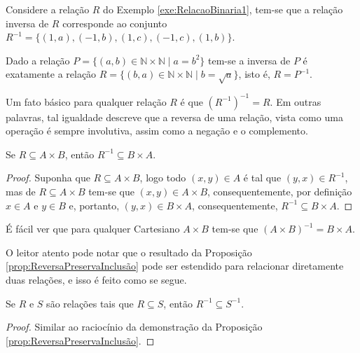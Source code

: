 \begin{example}
	Considere a relação $R$ do Exemplo \ref{exe:RelacaoBinaria1}, tem-se que a relação inversa de $R$ corresponde ao conjunto $R^{-1} = \{(1, a), (-1, b), (1, c), (-1, c), (1, b)\}$.
\end{example}

\begin{example}
	Dado a relação $P = \{(a, b) \in \mathbb{N} \times \mathbb{N} \mid a = b^2\}$ tem-se a inversa de $P$ é exatamente a relação $R = \{(b, a) \in \mathbb{N} \times \mathbb{N} \mid b = \sqrt{a}\}$, isto é, $R = P^{-1}$.
\end{example}

\begin{remark}\label{rema:InvolucaoRelacaoInversa}
	Um fato básico para qualquer relação $R$ é que $(R^{-1})^{-1} = R$. Em outras palavras, tal igualdade descreve que a reversa de uma relação, vista como uma operação é sempre involutiva, assim como a negação e o complemento.
\end{remark}

\begin{proposition}\label{prop:ReversaPreservaInclusão}
	Se $R \subseteq A \times B$, então $R^{-1} \subseteq B \times A$.
\end{proposition}

\begin{proof}
	Suponha que $R \subseteq A \times B$, logo todo $(x, y) \in A$ é tal que $(y, x) \in R^{-1}$, mas de $R \subseteq A \times B$ tem-se que $(x, y) \in A \times B$, consequentemente, por definição $x \in A$ e $y \in B$ e, portanto, $(y, x) \in B \times A$, consequentemente, $R^{-1} \subseteq B \times A$.
\end{proof}

\begin{remark}\label{rema:ReversaoRelacao}
	É fácil ver que para qualquer Cartesiano $A \times B$ tem-se que $(A \times B)^{-1} = B \times A$. 
\end{remark}

O leitor atento pode notar que o resultado da Proposição \ref{prop:ReversaPreservaInclusão} pode ser estendido para relacionar diretamente duas relações, e isso é feito como se segue.

\begin{theorem}\label{teo:ReversaPreservaInclusão}
	Se $R$ e $S$ são relações tais que $R \subseteq S$, então $R^{-1} \subseteq S^{-1}$.
\end{theorem}

\begin{proof}
	Similar ao raciocínio da demonstração da Proposição \ref{prop:ReversaPreservaInclusão}.
\end{proof}

